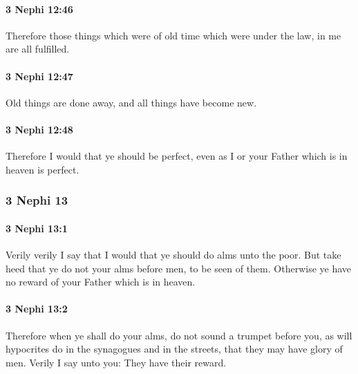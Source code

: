 		\paragraph{3 Nephi 12:46} %
			\label{3NEPHI-12-46}

			Therefore those things which were of old time
			which were under the law,
			in me are all fulfilled.

		\paragraph{3 Nephi 12:47} %
			\label{3NEPHI-12-47}

			Old things are done away,
			and all things have become new.

		\paragraph{3 Nephi 12:48} %
			\label{3NEPHI-12-48}

			Therefore I would that ye should be perfect,
			even as I or your Father which is in heaven is perfect.

	\subsubsection{3 Nephi 13} %
		\label{3NEPHI-13}
		
		\paragraph{3 Nephi 13:1} %
			\label{3NEPHI-13-1}

			Verily verily I say that I would that ye should do alms unto the poor.
			But take heed that ye do not your alms before men, to be seen of them.
			Otherwise ye have no reward of your Father which is in heaven.

		\paragraph{3 Nephi 13:2} %
			\label{3NEPHI-13-2}

			Therefore when ye shall do your alms,
			do not sound a trumpet before you,
			as will hypocrites do in the synagogues and in the streets,
			that they may have glory of men.
			Verily I say unto you:
			They have their reward.

